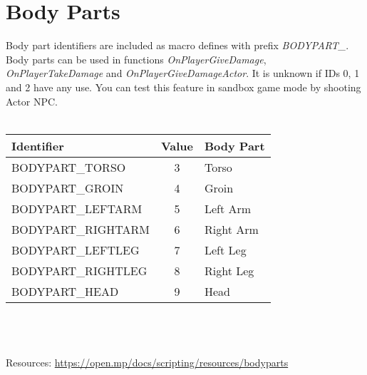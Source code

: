 \documentclass{article}
\begin{document}
\section{Body Parts}
Body part identifiers are included as macro defines with prefix \textit{BODYPART\_}. Body parts can be used in functions \textit{OnPlayerGiveDamage}, \textit{OnPlayerTakeDamage} and \textit{OnPlayerGiveDamageActor}. It is unknown if IDs 0, 1 and 2 have any use. You can test this feature in sandbox game mode by shooting Actor NPC.
\\
\\
\begin{tabular}{ |l|c|l| } 
\hline
Identifier & Value & Body Part \\
\hline
BODYPART\_TORSO & 3 & Torso \\ 
BODYPART\_GROIN & 4 & Groin \\
BODYPART\_LEFTARM & 5 & Left Arm \\
BODYPART\_RIGHTARM & 6 & Right Arm \\
BODYPART\_LEFTLEG & 7 & Left Leg \\
BODYPART\_RIGHTLEG & 8 & Right Leg \\
BODYPART\_HEAD & 9 & Head \\
\hline
\end{tabular}
\\
\\
\\Resources: \url{https://open.mp/docs/scripting/resources/bodyparts}
\end{document}
